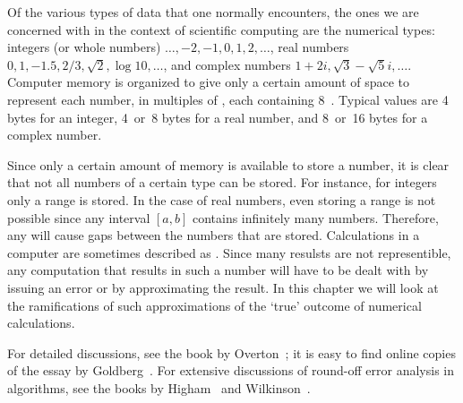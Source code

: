 

Of the various types of data that one normally encounters, the ones we
are concerned with in the context of scientific computing are the
numerical types: integers (or whole numbers)
$\ldots,-2,-1,0,1,2,\ldots$, real numbers $0,1,-1.5,2/3,\sqrt 2,\log
10,\ldots$, and complex numbers $1+2i,\sqrt 3-\sqrt 5i,\ldots$.
Computer memory is organized to give only a certain amount of space to
represent each number, in multiples of , each
containing 8~. Typical values are 4 bytes for an
integer,  4~or~8 bytes for a real number, and 8~or~16 bytes for a
complex number.

Since only a certain amount of memory is available to store a number,
it is clear that not all numbers of a certain type can be stored. For
instance, for integers only a range is stored. In the case of real
numbers, even storing a range is not possible since any interval $[a,b]$
contains infinitely many numbers. Therefore, any
 will cause gaps between the
numbers that are stored. 
Calculations in a computer are sometimes
described as .
Since many resulsts are not representible, any computation that results in
such a number will have to be dealt with by issuing an
error or by approximating the result. 
In this chapter we will look at
the ramifications of such approximations of the `true' outcome of
numerical calculations. 

For detailed discussions, see the book by
Overton~\cite{Overton:754book}; it is easy to find online copies of
the essay by Goldberg~\cite{goldberg:floatingpoint}. For extensive
discussions of round-off error analysis in algorithms, see the books
by Higham~\cite{Higham:2002:ASN} and Wilkinson~\cite{Wilkinson:roundoff}.

